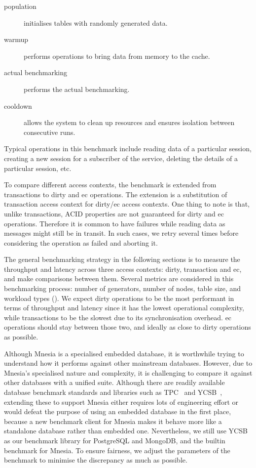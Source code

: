 \begin{description}
  \item[population] initialises tables with randomly generated data.
  \item[warmup] performs operations to bring data from memory to the cache.
  \item[actual benchmarking] performs the actual benchmarking.
  \item[cooldown] allows the system to clean up resources and ensures isolation
  between consecutive runs.
\end{description}

Typical operations in this benchmark include reading
data of a particular session, creating a new session for a subscriber of
the service, deleting the details of a particular session, etc.

To compare different access contexts, the benchmark is extended from transactions 
to dirty and \acrshort{ec} operations. The extension is a substitution of transaction
access context for dirty/\acrshort{ec} access contexts. One thing to note is that,
unlike transactions, ACID properties are not guaranteed for dirty and \acrshort{ec}
operations. Therefore it is common
to have failures while reading data as messages might still be in transit. 
In such cases, we retry several times before considering the operation
as failed and aborting it.

The general benchmarking strategy in the following sections is to measure 
the throughput and latency across three access contexts: dirty, transaction 
and \acrshort{ec}, and make comparisons between them. Several metrics are 
considered in this benchmarking process: number of generators, 
number of nodes, table size, and workload types 
().
We expect dirty operations to be the most performant in terms of throughput and 
latency since it has the lowest 
operational complexity, while transactions to be the slowest
due to its synchronisation overhead. \acrshort{ec} operations should stay
between those two, and ideally as close to dirty operations as possible.

Although Mnesia is a specialised embedded database, it is worthwhile trying to understand
how it performs against other mainstream databases. However, due to Mnesia's specialised nature
and complexity, it is challenging to compare it against other databases with a unified 
suite. Although there are readily available database benchmark standards and libraries such
as TPC~\cite{thetransactionprocessingcouncil2023tpc} and YCSB~\cite{cooper2010ycsb}, 
extending these to support Mnesia either requires lots of
engineering effort or would defeat the purpose of using an embedded database in 
the first place, because a new benchmark client for Mnesia makes it behave more 
like a standalone database rather than embedded one. Nevertheless, we still use 
YCSB as our benchmark library for PostgreSQL and MongoDB, and the builtin benchmark 
for Mnesia. To ensure fairness, we adjust the parameters 
of the benchmark to minimise the discrepancy as much as possible.



